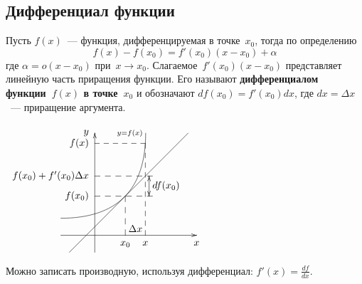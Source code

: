 \subsection{Дифференциал функции}
  Пусть $f(x)$~--- функция, дифференцируемая в точке~$x_0$, тогда по определению
\begin{equation*}
f(x) - f(x_0) = f'(x_0)(x - x_0) + \alpha
\end{equation*}
где $\alpha = o(x - x_0)$ при~$x \to x_0$.
Слагаемое~$f'(x_0)(x - x_0)$ представляет линейную часть приращения функции.
Его называют \textbf{дифференциалом функции~$f(x)$ в точке~$x_0$} и обозначают $df(x_0) = f'(x_0)dx$, где $dx = \Delta x$~--- приращение аргумента.

\begin{center}
\noindent
$\begin{xy} /r12mm/:
(-1, 0); (3, 0) **@{-} *@{>} *++!U{x};
(0, -0.5); (0, 3) **@{-} *@{>} *++!R{y};
(-1, 0.5); (1.5, 3) **\crv{(1.5, 0.5)} *+!R{\scriptstyle y = f(x)};
(-0.75, -0.5); (2.75, 3) **@{-}; %
(0.9, 1.15) = "M"; (0.9, 0) **@{--} *++!U{x_0};
(1.7, 1.15); (0, 1.15) **@{--} *++!R{f(x_0)};
(1.49, 2.7) = "X"; (1.49, 0) **@{--} *++!U{x};
"X"; (0, 2.7) **@{--} *++!R{f(x)};
(1.2, 0.2) *{\Delta x};
(1.7, 1.74); (0, 1.74) **@{--} *++!R{f(x_0) + f'(x_0) \Delta x};
(1.6, 1.74); (1.6, 1.15) **{} *@{>}; %
(1.6, 1.74) **@{-} *@{>};
(2.1, 1.45) *{df(x_0)};
\end{xy}$
\end{center}

Можно записать производную, используя дифференциал: $\displaystyle f'(x) = \frac{df}{dx}$.